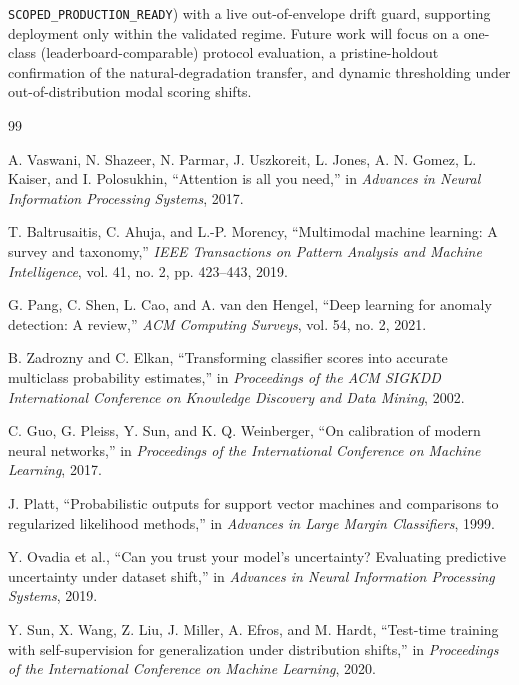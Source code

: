 \documentclass[10pt,conference]{IEEEtran}
\begin{document}
\texttt{SCOPED\_PRODUCTION\_READY}) with a live out-of-envelope drift guard, supporting deployment only within the validated regime. Future work will focus on a one-class (leaderboard-comparable) protocol evaluation, a pristine-holdout confirmation of the natural-degradation transfer, and dynamic thresholding under out-of-distribution modal scoring shifts.

\begin{thebibliography}{99}

A. Vaswani, N. Shazeer, N. Parmar, J. Uszkoreit, L. Jones, A. N. Gomez,
L. Kaiser, and I. Polosukhin, ``Attention is all you need,'' in
\emph{Advances in Neural Information Processing Systems}, 2017.

T. Baltrusaitis, C. Ahuja, and L.-P. Morency, ``Multimodal machine learning:
A survey and taxonomy,'' \emph{IEEE Transactions on Pattern Analysis and Machine
Intelligence}, vol. 41, no. 2, pp. 423--443, 2019.

G. Pang, C. Shen, L. Cao, and A. van den Hengel, ``Deep learning for anomaly
detection: A review,'' \emph{ACM Computing Surveys}, vol. 54, no. 2, 2021.

B. Zadrozny and C. Elkan, ``Transforming classifier scores into accurate
multiclass probability estimates,'' in \emph{Proceedings of the ACM SIGKDD
International Conference on Knowledge Discovery and Data Mining}, 2002.

C. Guo, G. Pleiss, Y. Sun, and K. Q. Weinberger, ``On calibration of modern
neural networks,'' in \emph{Proceedings of the International Conference on
Machine Learning}, 2017.

J. Platt, ``Probabilistic outputs for support vector machines and comparisons
to regularized likelihood methods,'' in \emph{Advances in Large Margin
Classifiers}, 1999.

Y. Ovadia et al., ``Can you trust your model's uncertainty? Evaluating
predictive uncertainty under dataset shift,'' in \emph{Advances in Neural
Information Processing Systems}, 2019.

Y. Sun, X. Wang, Z. Liu, J. Miller, A. Efros, and M. Hardt, ``Test-time
training with self-supervision for generalization under distribution shifts,''
in \emph{Proceedings of the International Conference on Machine Learning}, 2020.


\end{thebibliography}
\end{document}
